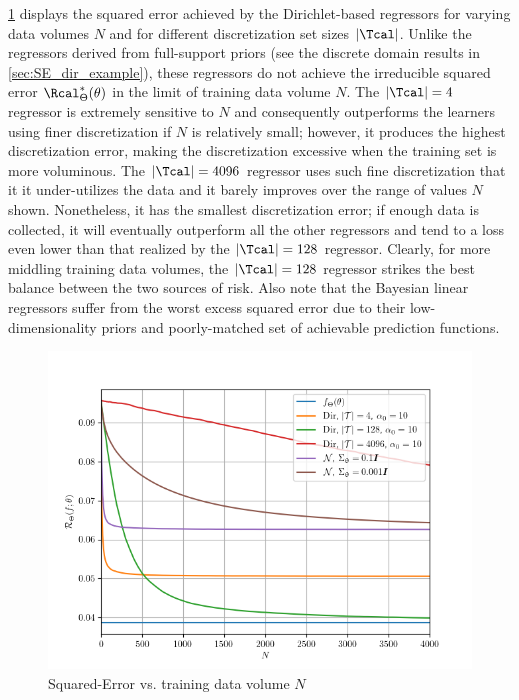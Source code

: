 \documentclass[12pt]{report}
\begin{document}
\cref{fig:Discretization/SE/risk_N_leg_T} displays the squared error achieved by the Dirichlet-based regressors for varying data volumes $N$ and for different discretization set sizes $|\Tcal|$. Unlike the regressors derived from full-support priors (see the discrete domain results in \cref{sec:SE_dir_example}), these regressors do not achieve the irreducible squared error $\Rcal_{\Theta}^*(\theta)$ in the limit of training data volume $N$. The $|\Tcal| = 4$ regressor is extremely sensitive to $N$ and consequently outperforms the learners using finer discretization if $N$ is relatively small; however, it produces the highest discretization error, making the discretization excessive when the training set is more voluminous. The $|\Tcal| = 4096$ regressor uses such fine discretization that it it under-utilizes the data and it barely improves over the range of values $N$ shown. Nonetheless, it has the smallest discretization error; if enough data is collected, it will eventually outperform all the other regressors and tend to a loss even lower than that realized by the $|\Tcal| = 128$ regressor. Clearly, for more middling training data volumes, the $|\Tcal| = 128$ regressor strikes the best balance between the two sources of risk. Also note that the Bayesian linear regressors suffer from the worst excess squared error due to their low-dimensionality priors and poorly-matched set of achievable prediction functions.
\begin{figure}
	\centering
	\includegraphics[width=0.8\linewidth]{Discretization/SE/risk_N_leg_T.png}
	\caption{Squared-Error vs. training data volume $N$}
	\label{fig:Discretization/SE/risk_N_leg_T}
\end{figure}
\end{document}
